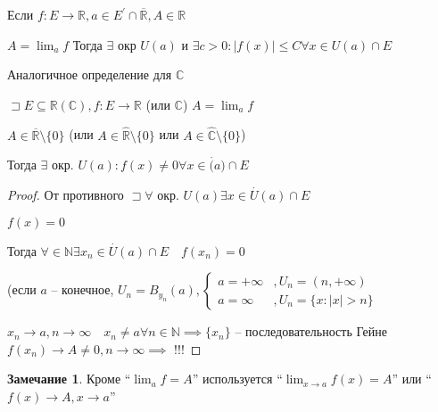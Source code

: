 \documentclass{book}
\newcommand\N{\ensuremath{\mathbb{N}}}
\newcommand\R{\ensuremath{\mathbb{R}}}
\renewcommand\C{\ensuremath{\mathbb{C}}}
\newcommand{\p}[1]{#1^{\prime}}
\newcommand{\ov}[1]{\overline{#1}}
\theoremstyle{definition}
\newtheorem*{note}{Замечание}
\begin{document}
\begin{theorem}

    Если $f:E\to \R, a\in \p E\cap \ov{\R}, A\in \R$

    $A = \lim_af$ Тогда  $\exists $ окр $U(a)$ и $ \exists c>0: |f(x)|\leqslant C \forall x\in U(a)\cap E$ 

    Аналогичное определение для $\C$
\end{theorem}

\begin{statement}

    $\sqsupset E\subseteq \R(\C), f:E\to \R$ (или $\C$) $A = \lim_af$

    $A\in \ov{\R}\setminus \{0\}$ (или $A\in \widehat{\R}\setminus \{0\}$ или $A\in \widehat{\C}\setminus \{0\}$)

    Тогда $\exists $ окр. $U(a): f(x)\neq 0 \forall x\in \overset{\cdot }(a)\cap E$
\end{statement}
\begin{proof}
    От противного $\sqsupset \forall $ окр. $U(a) \exists x\in \overset{\cdot }U(a)\cap E$

    $f(x) = 0$

    Тогда $\forall \in \N \exists x_{n} \in \overset{\cdot }U(a)\cap E\quad f(x_{n} )=0$

    (если $a$ -- конечное,  $U_n = B_{y_n}(a), \begin{cases}
        a = +\infty &, U_n = (n, +\infty )\\
        a = \infty &, U_n = \{x:|x|>n\}
    \end{cases}$

    $x_{n} \to a, n\to \infty \quad x_{n} \neq a \forall n\in \N  \implies \{x_{n} \}$ -- последовательность Гейне $f(x_{n} )\to A\neq 0, n\to \infty  \implies $ !!!
\end{proof}

\begin{note}
    Кроме ``$\lim_af=A$'' используется ``$\lim_{x \to a} f(x)=A$'' или ``$f(x)\to A, x\to a$''
\end{note}
\end{document}
